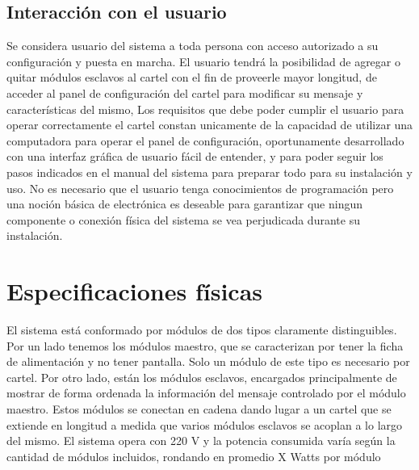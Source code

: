 \subsection{Interacción con el usuario}
	
	Se considera usuario del sistema a toda persona con acceso autorizado a su configuración y puesta en marcha. El usuario tendrá la posibilidad de agregar o quitar módulos esclavos al cartel con el fin de proveerle mayor longitud, de acceder al panel de configuración del cartel para modificar su mensaje y características del mismo, Los requisitos que debe poder cumplir el usuario para operar correctamente el cartel constan unicamente de la capacidad de utilizar una computadora para operar el panel de configuración, oportunamente desarrollado con una interfaz gráfica de usuario fácil de entender, y para poder seguir los pasos indicados en el manual del sistema para preparar todo para su instalación y uso. No es necesario que el usuario tenga conocimientos de programación pero una noción básica de electrónica es deseable para garantizar que ningun componente o conexión física del sistema se vea perjudicada durante su instalación.
	
\section{Especificaciones físicas}

	El sistema está conformado por módulos de dos tipos claramente distinguibles. Por un lado tenemos los módulos maestro, que se caracterizan por tener la ficha de alimentación y no tener pantalla. Solo un módulo de este tipo es necesario por cartel. Por otro lado, están los módulos esclavos, encargados principalmente de mostrar de forma ordenada la información del mensaje controlado por el módulo maestro. Estos módulos se conectan en cadena dando lugar a un cartel que se extiende en longitud a medida que varios módulos esclavos se acoplan a lo largo del mismo. 
	El sistema opera con 220 V y la potencia consumida varía según la cantidad de módulos incluidos, rondando en promedio X Watts por módulo 
	
	
